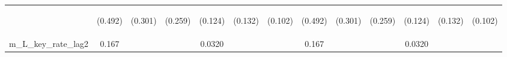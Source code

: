 \documentclass[]{article}
\begin{document}
\begin{center}
\begin{tabular}{lcccccccccccc}
\vspace{4pt} & \begin{footnotesize}(0.492)\end{footnotesize} & \begin{footnotesize}(0.301)\end{footnotesize} & \begin{footnotesize}(0.259)\end{footnotesize} & \begin{footnotesize}(0.124)\end{footnotesize} & \begin{footnotesize}(0.132)\end{footnotesize} & \begin{footnotesize}(0.102)\end{footnotesize} & \begin{footnotesize}(0.492)\end{footnotesize} & \begin{footnotesize}(0.301)\end{footnotesize} & \begin{footnotesize}(0.259)\end{footnotesize} & \begin{footnotesize}(0.124)\end{footnotesize} & \begin{footnotesize}(0.132)\end{footnotesize} & \begin{footnotesize}(0.102)\end{footnotesize} \\
m\_L\_key\_rate\_lag2 & 0.167 &  &  & 0.0320 &  &  & 0.167 &  &  & 0.0320 &  &  \\

\end{tabular}
\end{center}
\end{document}

